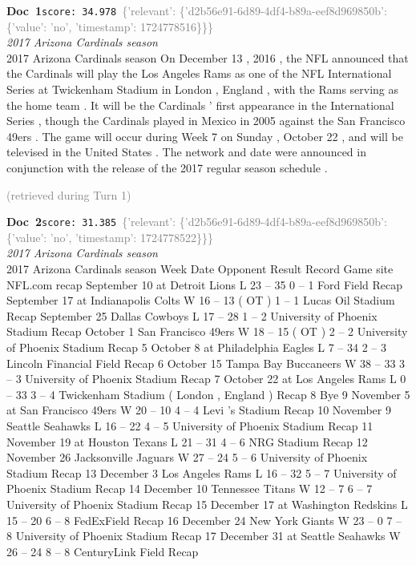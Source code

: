 \documentclass[a4paper,11pt]{article}
\begin{document}
\begin{docenv}
{\footnotesize\textcolor{doccolor}{\textbf{Doc~1}}}\hfill{\tiny\texttt{score:~34.978}}\ {\tiny\textcolor{gray}{\{'relevant': \{'d2b56e91-6d89-4df4-b89a-eef8d969850b': \{'value': 'no', 'timestamp': 1724778516\}\}\}}}\\[3pt]
{\small\textit{2017 Arizona Cardinals season}}\\[2pt]
\vspace{2pt}
{\footnotesize 2017 Arizona Cardinals season
On December 13 , 2016 , the NFL announced that the Cardinals will play the Los Angeles Rams as one of the NFL International Series at Twickenham Stadium in London , England , with the Rams serving as the home team . It will be the Cardinals ' first appearance in the International Series , though the Cardinals played in Mexico in 2005 against the San Francisco 49ers . The game will occur during Week 7 on Sunday , October 22 , and will be televised in the United States . The network and date were announced in conjunction with the release of the 2017 regular season schedule .}
\end{docenv}
\hfill{\tiny\textcolor{gray}{(retrieved during Turn 1)}}
\begin{docenv}
{\footnotesize\textcolor{doccolor}{\textbf{Doc~2}}}\hfill{\tiny\texttt{score:~31.385}}\ {\tiny\textcolor{gray}{\{'relevant': \{'d2b56e91-6d89-4df4-b89a-eef8d969850b': \{'value': 'no', 'timestamp': 1724778522\}\}\}}}\\[3pt]
{\small\textit{2017 Arizona Cardinals season}}\\[2pt]
\vspace{2pt}
{\footnotesize 2017 Arizona Cardinals season
Week Date Opponent Result Record Game site NFL.com recap September 10 at Detroit Lions L 23 -- 35 0 -- 1 Ford Field Recap September 17 at Indianapolis Colts W 16 -- 13 ( OT ) 1 -- 1 Lucas Oil Stadium Recap September 25 Dallas Cowboys L 17 -- 28 1 -- 2 University of Phoenix Stadium Recap October 1 San Francisco 49ers W 18 -- 15 ( OT ) 2 -- 2 University of Phoenix Stadium Recap 5 October 8 at Philadelphia Eagles L 7 -- 34 2 -- 3 Lincoln Financial Field Recap 6 October 15 Tampa Bay Buccaneers W 38 -- 33 3 -- 3 University of Phoenix Stadium Recap 7 October 22 at Los Angeles Rams L 0 -- 33 3 -- 4 Twickenham Stadium ( London , England ) Recap 8 Bye 9 November 5 at San Francisco 49ers W 20 -- 10 4 -- 4 Levi 's Stadium Recap 10 November 9 Seattle Seahawks L 16 -- 22 4 -- 5 University of Phoenix Stadium Recap 11 November 19 at Houston Texans L 21 -- 31 4 -- 6 NRG Stadium Recap 12 November 26 Jacksonville Jaguars W 27 -- 24 5 -- 6 University of Phoenix Stadium Recap 13 December 3 Los Angeles Rams L 16 -- 32 5 -- 7 University of Phoenix Stadium Recap 14 December 10 Tennessee Titans W 12 -- 7 6 -- 7 University of Phoenix Stadium Recap 15 December 17 at Washington Redskins L 15 -- 20 6 -- 8 FedExField Recap 16 December 24 New York Giants W 23 -- 0 7 -- 8 University of Phoenix Stadium Recap 17 December 31 at Seattle Seahawks W 26 -- 24 8 -- 8 CenturyLink Field Recap}
\end{docenv}
\end{document}
